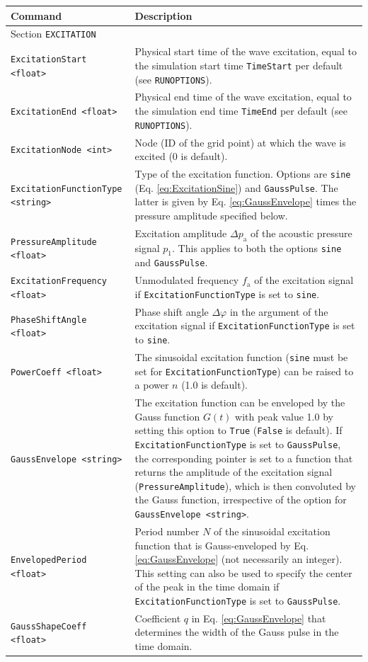 \noindent
\begin{longtable}{p{} p{}}
\textbf{Command} & \textbf{Description}
\vspace{1mm} \\
\hline Section {\tt EXCITATION} &\\ \hline
{\tt ExcitationStart <float>} & Physical start time of the wave excitation, equal to the simulation start time {\tt TimeStart} per default (see {\tt RUNOPTIONS}). \\
{\tt ExcitationEnd <float>} & Physical end time of the wave excitation, equal to the simulation end time {\tt TimeEnd} per default (see {\tt RUNOPTIONS}). \\
{\tt ExcitationNode <int>} & Node (ID of the grid point) at which the wave is excited (0 is default). \\
{\tt ExcitationFunctionType <string>} & Type of the excitation function. Options are {\tt sine} (Eq. \eqref{eq:ExcitationSine}) and {\tt GaussPulse}. The latter is given by Eq. \eqref{eq:GaussEnvelope} times the pressure amplitude specified below. \\
{\tt PressureAmplitude <float>} & Excitation amplitude $\Delta p_{\mathrm{a}}$ of the acoustic pressure signal $p_1$. This applies to both the options {\tt sine} and {\tt GaussPulse}. \\
{\tt ExcitationFrequency <float>} & Unmodulated frequency $f_{\mathrm{a}}$ of the excitation signal if {\tt ExcitationFunctionType} is set to {\tt sine}. \\
{\tt PhaseShiftAngle <float>} & Phase shift angle $\Delta \varphi$ in the argument of the excitation signal if {\tt ExcitationFunctionType} is set to {\tt sine}. \\
{\tt PowerCoeff <float>} & The sinusoidal excitation function ({\tt sine} must be set for {\tt ExcitationFunctionType}) can be raised to a power $n$ (1.0 is default).\\
{\tt GaussEnvelope <string>} & The excitation function can be enveloped by the Gauss function $G\left(t\right)$ with peak value 1.0 by setting this option to {\tt True} ({\tt False} is default). If {\tt ExcitationFunctionType} is set to {\tt GaussPulse}, the corresponding pointer is set to a function that returns the amplitude of the excitation signal ({\tt PressureAmplitude}), which is then convoluted by the Gauss function, irrespective of the option for {\tt GaussEnvelope <string>}. \\
{\tt EnvelopedPeriod <float>} & Period number $N$ of the sinusoidal excitation function that is Gauss-enveloped by Eq. \eqref{eq:GaussEnvelope} (not necessarily an integer). This setting can also be used to specify the center of the peak in the time domain if {\tt ExcitationFunctionType} is set to {\tt GaussPulse}.\\
{\tt GaussShapeCoeff <float>} & Coefficient $q$ in Eq. \eqref{eq:GaussEnvelope} that determines the width of the Gauss pulse in the time domain. \\
\hline
\end{longtable} \vspace{1em}

